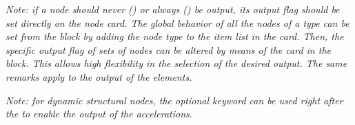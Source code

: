 \noindent
{\em
   Note: if a node should never () or always () be output,
   its output flag should be set directly on the node card. 
   The global behavior of all the nodes of a type can be set from the 
    block by adding the node type to the item list in the 
    card. 
   Then, the specific output flag of sets of nodes can be altered by means 
   of the  card in the  block. 
   This allows high flexibility in the selection of the desired output. 
   The same remarks apply to the output of the elements.
}

{\em
    Note: for dynamic structural nodes, the optional keyword 
    can be used right after the  to enable the output
    of the accelerations.
}

